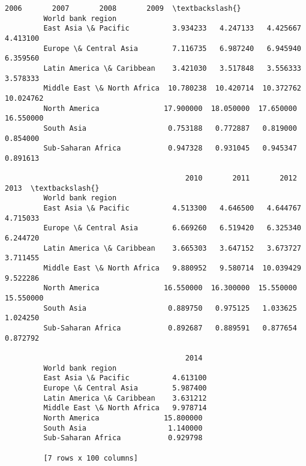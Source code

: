 \documentclass[11pt]{article}
\begin{document}
\begin{Verbatim}[commandchars=\\\{\}]
                                          2006       2007       2008       2009  \textbackslash{}
         World bank region                                                        
         East Asia \& Pacific          3.934233   4.247133   4.425667   4.413100   
         Europe \& Central Asia        7.116735   6.987240   6.945940   6.359560   
         Latin America \& Caribbean    3.421030   3.517848   3.556333   3.578333   
         Middle East \& North Africa  10.780238  10.420714  10.372762  10.024762   
         North America               17.900000  18.050000  17.650000  16.550000   
         South Asia                   0.753188   0.772887   0.819000   0.854000   
         Sub-Saharan Africa           0.947328   0.931045   0.945347   0.891613   
         
                                          2010       2011       2012       2013  \textbackslash{}
         World bank region                                                        
         East Asia \& Pacific          4.513300   4.646500   4.644767   4.715033   
         Europe \& Central Asia        6.669260   6.519420   6.325340   6.244720   
         Latin America \& Caribbean    3.665303   3.647152   3.673727   3.711455   
         Middle East \& North Africa   9.880952   9.580714  10.039429   9.522286   
         North America               16.550000  16.300000  15.550000  15.550000   
         South Asia                   0.889750   0.975125   1.033625   1.024250   
         Sub-Saharan Africa           0.892687   0.889591   0.877654   0.872792   
         
                                          2014  
         World bank region                      
         East Asia \& Pacific          4.613100  
         Europe \& Central Asia        5.987400  
         Latin America \& Caribbean    3.631212  
         Middle East \& North Africa   9.978714  
         North America               15.800000  
         South Asia                   1.140000  
         Sub-Saharan Africa           0.929798  
         
         [7 rows x 100 columns]
\end{Verbatim}
            
\end{document}
